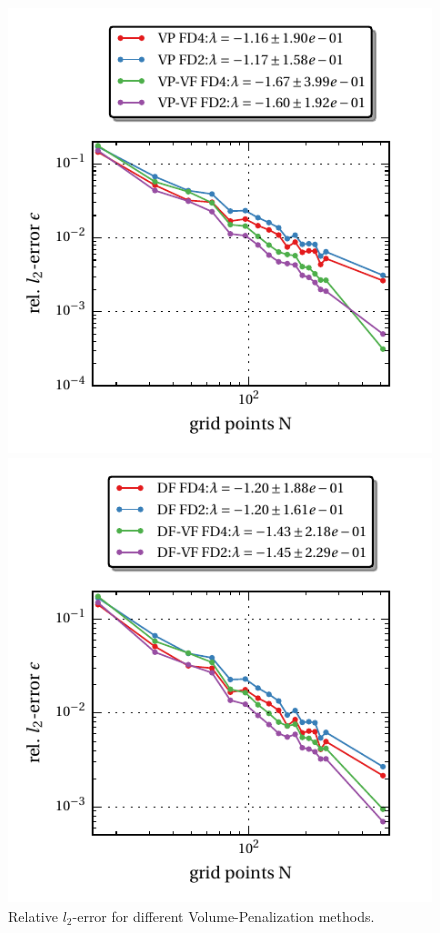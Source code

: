 \begin{figure}[!bp]
  \begin{minipage}[c]{0.5\textwidth}
      \includegraphics{gfx/immersed_boundary/hpflow/theo/vp.pdf}
      \caption{\label{vali:hp_flow_gc_vp}
          Relative $l_2$-error for different Volume-Penalization methods.}
  \end{minipage}
  \begin{minipage}[c]{0.5\textwidth}
      \includegraphics{gfx/immersed_boundary/hpflow/theo/df.pdf}

\end{minipage}
\end{figure}
